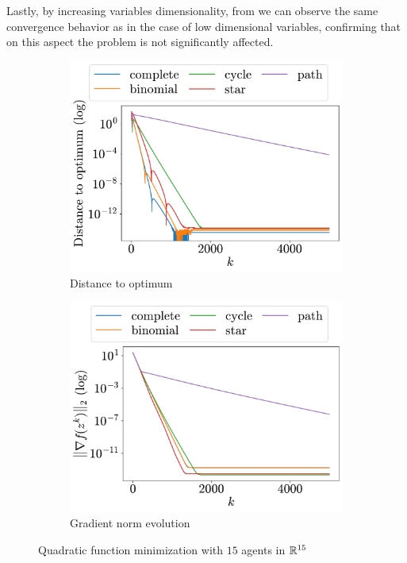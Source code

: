 \documentclass[a4paper,11pt,oneside]{book}
\begin{document}
Lastly, by increasing variables dimensionality, from  we can observe the same convergence behavior as in the case of low dimensional variables, confirming that on this aspect the problem is not significantly affected.

\begin{figure}[H]
      \centering
      \begin{subfigure}[t]{0.48\linewidth}
            \centering
            \includegraphics[width=\linewidth]{./figs/quadratic/15_15/distance.pdf} 
            \caption{Distance to optimum}
      \end{subfigure}
      \hfill
      \begin{subfigure}[t]{0.48\linewidth}
            \centering
            \includegraphics[width=\linewidth]{./figs/quadratic/15_15/gradient.pdf} 
            \caption{Gradient norm evolution}
      \end{subfigure}
      \caption{Quadratic function minimization with $15$ agents in ${\mathbb{R}}^{15}$}
      \label{fig:quadratic_15_15}
\end{figure}
\end{document}
